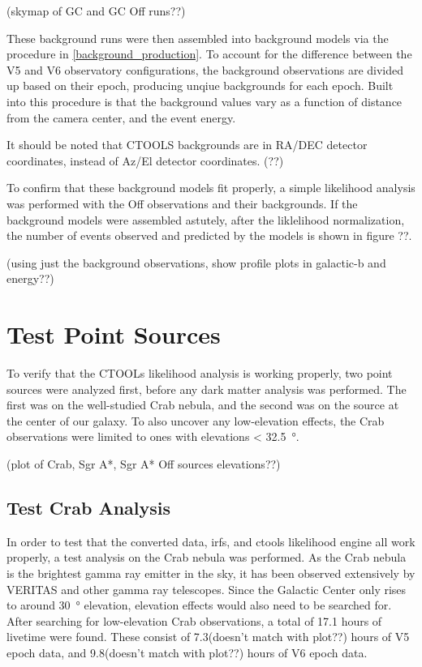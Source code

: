   (skymap of GC and GC Off runs??)

  These background runs were then assembled into background models via the procedure in \ref{background_production}.
  To account for the difference between the V5 and V6 observatory configurations, the background observations are divided up based on their epoch, producing unqiue backgrounds for each epoch.
  Built into this procedure is that the background values vary as a function of distance from the camera center, and the event energy.

  It should be noted that CTOOLS backgrounds are in RA/DEC detector coordinates, instead of Az/El detector coordinates. (??)

  To confirm that these background models fit properly, a simple likelihood analysis was performed with the Off observations and their backgrounds.
  If the background models were assembled astutely, after the liklelihood normalization, the number of events observed and predicted by the models is shown in figure ??.

  (using just the background observations, show profile plots in galactic-b and energy??)

\section{Test Point Sources}
  To verify that the CTOOLs likelihood analysis is working properly, two point sources were analyzed first, before any dark matter analysis was performed.
  The first was on the well-studied Crab nebula, and the second was on the source at the center of our galaxy.
  To also uncover any low-elevation effects, the Crab observations were limited to ones with elevations < \SI{32.5}{\degree}.

  (plot of Crab, Sgr A*, Sgr A* Off sources elevations??)

  \subsection{Test Crab Analysis}

    In order to test that the converted data, irfs, and ctools likelihood engine all work properly, a test analysis on the Crab nebula was performed.
    As the Crab nebula is the brightest gamma ray emitter in the sky, it has been observed extensively by VERITAS and other gamma ray telescopes.
    Since the Galactic Center only rises to around \SI{30}{\degree} elevation, elevation effects would also need to be searched for.
    After searching for low-elevation Crab observations, a total of 17.1 hours of livetime were found.
    These consist of 7.3(doesn't match with plot??) hours of V5 epoch data, and 9.8(doesn't match with plot??) hours of V6 epoch data.
    
